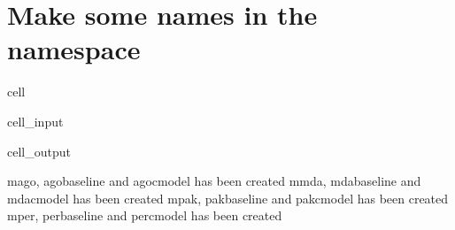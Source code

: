 \documentclass[letterpaper,10pt,english]{jupyterBook}
\begin{document}
\section{Make some names in the namespace}
\label{\detokenize{content/howto/onboard/eviews/onboard many models from wf1:make-some-names-in-the-namespace}}
\begin{sphinxuseclass}{cell}\begin{sphinxVerbatimInput}

\begin{sphinxuseclass}{cell_input}
\begin{sphinxVerbatim}[commandchars=\\\{\}]
   
      
      
      
    \PYG{p}{[}\PYG{p}{]}  
    \PYG{p}{[}\PYG{p}{]}  
    \PYG{p}{[}\PYG{p}{]} 
\end{sphinxVerbatim}

\end{sphinxuseclass}\end{sphinxVerbatimInput}
\begin{sphinxVerbatimOutput}

\begin{sphinxuseclass}{cell_output}
\begin{sphinxVerbatim}[commandchars=\\\{\}]
mago, ago\PYGZus{}baseline and ago\PYGZus{}cmodel has been created
mmda, mda\PYGZus{}baseline and mda\PYGZus{}cmodel has been created
mpak, pak\PYGZus{}baseline and pak\PYGZus{}cmodel has been created
mper, per\PYGZus{}baseline and per\PYGZus{}cmodel has been created
\end{sphinxVerbatim}

\end{sphinxuseclass}\end{sphinxVerbatimOutput}

\end{sphinxuseclass}
\end{document}
